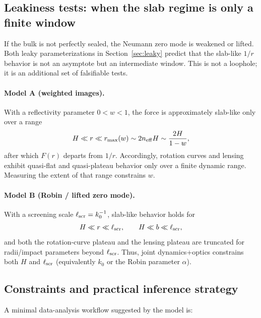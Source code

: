 \documentclass[11pt]{article}
\begin{document}
\subsection{Leakiness tests: when the slab regime is only a finite window}
\label{sec:tests_leaky}

If the bulk is not perfectly sealed, the Neumann zero mode is weakened or lifted.
Both leaky parameterizations in Section~\ref{sec:leaky} predict that the slab-like $1/r$ behavior is
not an asymptote but an intermediate window.
This is not a loophole; it is an additional set of falsifiable tests.

\paragraph{Model A (weighted images).}
With a reflectivity parameter $0<w<1$, the force is approximately slab-like only over a range
\begin{equation}
  H \ll r \ll r_{\max}(w)\sim 2n_{\rm eff}H \sim \frac{2H}{1-w},
\end{equation}
after which $F(r)$ departs from $1/r$.
Accordingly, rotation curves and lensing exhibit quasi-flat and quasi-plateau behavior only over a
finite dynamic range.  Measuring the extent of that range constrains $w$.

\paragraph{Model B (Robin / lifted zero mode).}
With a screening scale $\ell_{\rm scr}=k_0^{-1}$, slab-like behavior holds for
\begin{equation}
  H \ll r \ll \ell_{\rm scr},\qquad H \ll b \ll \ell_{\rm scr},
\end{equation}
and both the rotation-curve plateau and the lensing plateau are truncated for radii/impact
parameters beyond $\ell_{\rm scr}$.  Thus, joint dynamics+optics constrains both $H$ and
$\ell_{\rm scr}$ (equivalently $k_0$ or the Robin parameter $\alpha$).

\subsection{Constraints and practical inference strategy}
\label{sec:tests_inference}

A minimal data-analysis workflow suggested by the model is:
\end{document}
